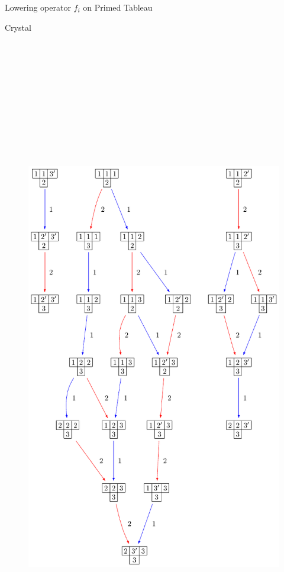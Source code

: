 \documentclass[final]{beamer}
\theoremstyle{definition}
\numberwithin{equation}{section}
\newlength{\onecolwid}
\begin{document}
\begin{frame}[t]
\begin{columns}[t]
\begin{column}{\onecolwid}
\begin{block}{Lowering operator $f_i$ on Primed Tableau}
\end{block}



\begin{block}{Crystal}
\begin{figure}[h]
\includegraphics[width=25cm, height=40cm]{Crystal}
\centering
\end{figure}
\end{block}



\end{column}
\end{columns}
\end{frame}
\end{document}
